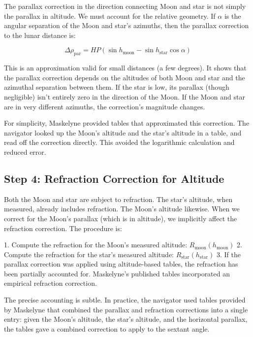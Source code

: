 The parallax correction in the direction connecting Moon and star is not simply the parallax in altitude. We must account for the relative geometry. If $\alpha$ is the angular separation of the Moon and star's azimuths, then the parallax correction to the lunar distance is:

\begin{equation}
\Delta\rho_{\text{par}} = HP(\sin h_{\text{moon}} - \sin h_{\text{star}} \cos \alpha) 
\end{equation}

This is an approximation valid for small distances (a few degrees). It shows that the parallax correction depends on the altitudes of both Moon and star and the azimuthal separation between them. If the star is low, its parallax (though negligible) isn't entirely zero in the direction of the Moon. If the Moon and star are in very different azimuths, the correction's magnitude changes.

For simplicity, Maskelyne provided tables that approximated this correction. The navigator looked up the Moon's altitude and the star's altitude in a table, and read off the correction directly. This avoided the logarithmic calculation and reduced error.

\subsection{Step 4: Refraction Correction for Altitude}

Both the Moon and star are subject to refraction. The star's altitude, when measured, already includes refraction. The Moon's altitude likewise. When we correct for the Moon's parallax (which is in altitude), we implicitly affect the refraction correction. The procedure is:

1. Compute the refraction for the Moon's measured altitude: $R_{\text{moon}}(h_{\text{moon}})$
2. Compute the refraction for the star's measured altitude: $R_{\text{star}}(h_{\text{star}})$
3. If the parallax correction was applied using altitude-based tables, the refraction has been partially accounted for. Maskelyne's published tables incorporated an empirical refraction correction.

The precise accounting is subtle. In practice, the navigator used tables provided by Maskelyne that combined the parallax and refraction corrections into a single entry: given the Moon's altitude, the star's altitude, and the horizontal parallax, the tables gave a combined correction to apply to the sextant angle.

